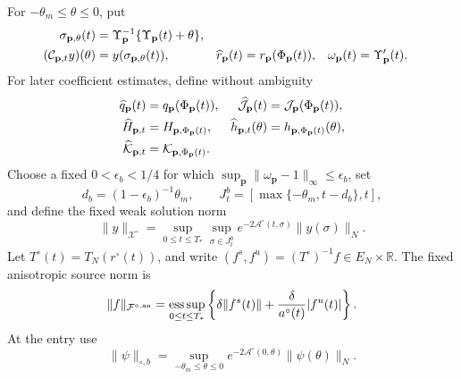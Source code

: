 \begin{lemma}
For \(-\theta_m\le\theta\le0\), put
\begin{align}
 \sigma_{\mathbf p,\theta}(t)
 &=\Upsilon_{\mathbf p}^{-1}
       \{\Upsilon_{\mathbf p}(t)+\theta\},\notag\\
 (\mathcal C_{\mathbf p,t}y)(\theta)
 &=y(\sigma_{\mathbf p,\theta}(t)),&
 \widehat r_{\mathbf p}(t)
 &=r_{\mathbf p}(\Phi_{\mathbf p}(t)),&
 \omega_{\mathbf p}(t)&=\Upsilon_{\mathbf p}'(t).
                                                        \label{eq:oe-fixed-action-pulled-objects}
\end{align}
For later coefficient estimates, define without ambiguity
\begin{align}
 \widehat q_{\mathbf p}(t)
 &=q_{\mathbf p}(\Phi_{\mathbf p}(t)),&
 \widehat{\mathcal J}_{\mathbf p}(t)
 &=\mathcal J_{\mathbf p}(\Phi_{\mathbf p}(t)),\notag\\
 \widehat H_{\mathbf p,t}
 &=H_{\mathbf p,\Phi_{\mathbf p}(t)},&
 \widehat h_{\mathbf p,t}(\theta)
 &=h_{\mathbf p,\Phi_{\mathbf p}(t)}(\theta),\notag\\
 \widehat{\mathcal K}_{\mathbf p,t}
 &=\mathcal K_{\mathbf p,\Phi_{\mathbf p}(t)}. \label{eq:oe-fixed-action-pulled-coefficients}
\end{align}
Choose a fixed \(0<\epsilon_b<1/4\) for which
\(\sup_{\mathbf p}\|\omega_{\mathbf p}-1\|_\infty\le\epsilon_b\), set
\[
 d_b=(1-\epsilon_b)^{-1}\theta_m,\qquad
 J_t^b=[\max\{-\theta_m,t-d_b\},t],
\]
and define the fixed weak solution norm
\begin{equation}
 \|y\|_{\mathcal X^\circ}
 =\sup_{0\le t\le T_*}
   \sup_{\sigma\in J_t^b}
    e^{-2\mathscr A^\circ(t,\sigma)}\|y(\sigma)\|_N.
                                                        \label{eq:oe-fixed-action-solution-norm}
\end{equation}
Let \(T^\circ(t)=T_N(r^\circ(t))\), and write
\((f^s,f^u)=(T^\circ)^{-1}f\in E_N\times\mathbb R\).  The fixed
anisotropic source norm is
\begin{equation}
 \|f\|_{\mathcal F^{\circ,\rm an}}
 =\operatorname*{ess\,sup}_{0\le t\le T_*}
   \left\{\delta\|f^s(t)\|
       +\frac{\delta}{a^\circ(t)}|f^u(t)|\right\}.          \label{eq:oe-fixed-action-source-norm}
\end{equation}
At the entry use
\begin{equation}
 \|\psi\|_{\circ,b}
 =\sup_{-\theta_m\le\theta\le0}
 e^{-2\mathscr A^\circ(0,\theta)}\|\psi(\theta)\|_N.
                                                        \label{eq:oe-fixed-action-entry-norm}
\end{equation}

\end{lemma}
